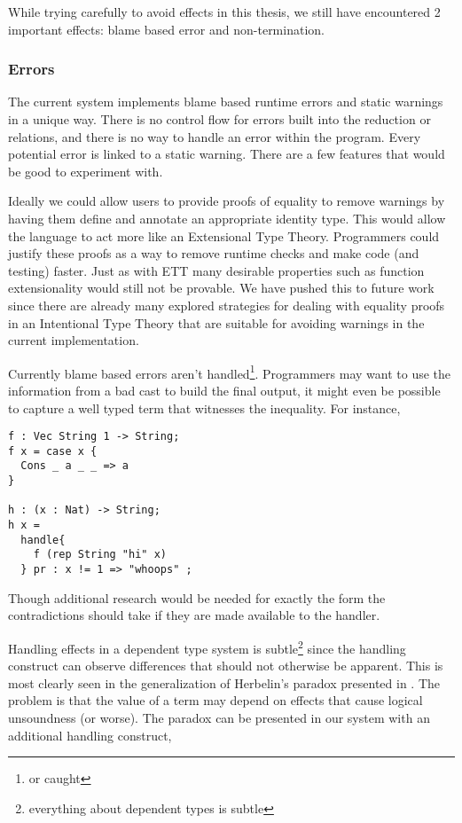 While trying carefully to avoid effects in this thesis, we still have encountered 2 important effects: blame based error and non-termination.

\subsubsection{Errors}

The current system implements blame based runtime errors and static warnings in a unique way.
There is no control flow for errors built into the reduction or \cbv{} relations, and there is no way to handle an error within the program.
Every potential error is linked to a static warning.
There are a few features that would be good to experiment with.

Ideally we could allow users to provide proofs of equality to remove warnings by having them define and annotate an appropriate identity type.
This would allow the language to act more like an Extensional Type Theory.
Programmers could justify these proofs as a way to remove runtime checks and make code (and testing) faster.
Just as with \ac{ETT} many desirable properties such as function extensionality would still not be provable.
We have pushed this to future work since there are already many explored strategies for dealing with equality proofs in an Intentional Type Theory that are suitable for avoiding warnings in the current implementation.

Currently blame based errors aren't handled\footnote{or caught}.
Programmers may want to use the information from a bad cast to build the final output, it might even be possible to capture a well typed term that witnesses the inequality.
For instance,
\begin{lstlisting}
f : Vec String 1 -> String;
f x = case x {
  Cons _ a _ _ => a
}

h : (x : Nat) -> String;
h x =
  handle{
    f (rep String "hi" x)
  } pr : x != 1 => "whoops" ;
\end{lstlisting}

Though additional research would be needed for exactly the form the contradictions should take if they are made available to the handler.

Handling effects in a dependent type system is subtle\footnote{everything about dependent types is subtle} since the handling construct can observe differences that should not otherwise be apparent.
This is most clearly seen in the generalization of Herbelin's paradox presented in \cite{pedrot2020fire}.
The problem is that the value of a \Bool{} term may depend on effects that cause logical unsoundness (or worse).
The paradox can be presented in our system with an additional handling construct,

